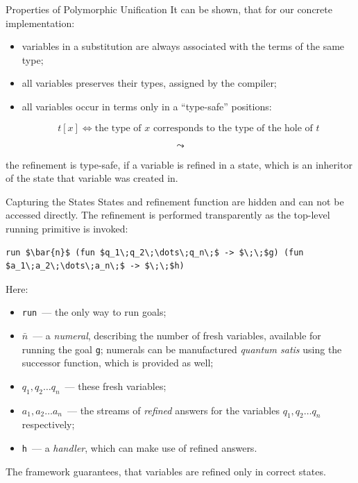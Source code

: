 \documentclass[10pt, mathserif]{beamer}
\theoremstyle{definition}
\begin{document}
\begin{frame}[fragile]{Properties of Polymorphic Unification}
It can be shown, that for our concrete implementation:\pause

\begin{itemize}
\item variables in a substitution are always associated with the terms of the same type;\pause
\item all variables preserves their types, assigned by the compiler;\pause
\item all variables occur in terms only in a ``type-safe'' positions:

$$
t[x] \iff \mbox{the type of }x\mbox{ corresponds to the type of the hole of }t 
$$ 
\end{itemize}\pause

$$\leadsto$$

the refinement is type-safe, if a variable is refined in a state, which is an inheritor
of the state that variable was created in.
\end{frame}

\begin{frame}[fragile]{Capturing the States}
States and refinement function are hidden and can not be accessed directly.\pause
\vskip3mm
The refinement is performed transparently as the top-level running primitive
is invoked:\pause
\vskip3mm
\begin{lstlisting}[mathescape=true]
    run $\bar{n}$ (fun $q_1\;q_2\;\dots\;q_n\;$ -> $\;\;$g) (fun $a_1\;a_2\;\dots\;a_n\;$ -> $\;\;$h)
\end{lstlisting}\pause

Here:
{\small
\begin{itemize}
\item \lstinline{run}~--- the only way to run goals;
\item $\bar{n}$~--- a \emph{numeral}, describing the number of fresh variables, 
available for running the goal \lstinline{g}; numerals can be manufactured
\emph{quantum satis} using the successor function, which is provided as well;
\item $q_1, q_2\dots q_n$~--- these fresh variables;
\item $a_1, a_2\dots a_n$~--- the streams of \emph{refined} answers for the variables
$q_1, q_2\dots q_n$ respectively;
\item \lstinline{h}~--- a \emph{handler}, which can make use of refined answers.
\end{itemize}
}

The framework guarantees, that variables are refined only in correct states.

\end{frame}
\end{document}
